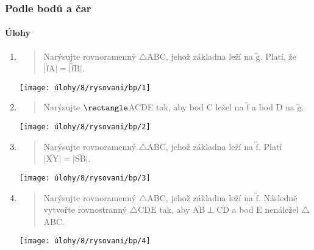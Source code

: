 \newpage

\subsubsection{Podle bodů a čar}

\paragraph{Úlohy}
\begin{enumerate}
    \item
    \begin{minipage}[t]{\linewidth}
        \begin{quote}
            Narýsujte rovnoramenný $\triangle$ABC, jehož základna leží na $\overleftrightarrow{\text{g}}$.
            Platí, že $\lvert \overleftrightarrow{\text{f}} \text{A} \rvert = \lvert \overleftrightarrow{\text{f}} \text{B} \rvert$.
        \end{quote}
        \centering
        \texttt{[image: úlohy/8/rysovani/bp/1]}

    \end{minipage}

    \item
    \begin{minipage}[t]{\linewidth}
        \begin{quote}
            Narýsujte $\rectangle$ACDE tak, aby bod C ležel na $\overleftrightarrow{\text{f}}$ a bod D na $\overleftrightarrow{\text{g}}$.
        \end{quote}
        \centering
        \texttt{[image: úlohy/8/rysovani/bp/2]}

    \end{minipage}

    \item
    \begin{minipage}[t]{\linewidth}
        \begin{quote}
            Narýsujte rovnoramenný $\triangle$ABC, jehož základna leží na $\overleftrightarrow{\text{f}}$.
            Platí $\lvert \overline{\text{XY}} \rvert = \lvert \overline{\text{SB}} \rvert$.
        \end{quote}
        \centering
        \texttt{[image: úlohy/8/rysovani/bp/3]}

    \end{minipage}

    \item
    \begin{minipage}[t]{\linewidth}
        \begin{quote}
            Narýsujte rovnoramenný $\triangle$ABC, jehož základna leží na $\overleftrightarrow{\text{f}}$.
            Následně vytvořte rovnostranný $\triangle{\text{CDE}}$ tak, aby $\overline{\text{AB}} \perp \overline{\text{CD}}$ a bod E nenáležel $\triangle$ABC\@.
        \end{quote}
        \centering
        \texttt{[image: úlohy/8/rysovani/bp/4]}


\end{minipage}
\end{enumerate}
